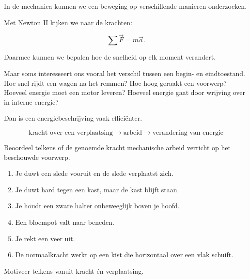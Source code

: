 \documentclass{ximera}
\begin{document}

In de mechanica kunnen we een beweging op verschillende manieren onderzoeken.

Met Newton II kijken we naar de krachten:

\[
\sum\vec F=m\vec a.
\]

Daarmee kunnen we bepalen hoe de snelheid op elk moment verandert.

Maar soms interesseert ons vooral het verschil tussen een begin- en
eindtoestand. Hoe snel rijdt een wagen na het remmen? Hoe hoog geraakt een
voorwerp? Hoeveel energie moet een motor leveren? Hoeveel energie gaat door
wrijving over in interne energie?

Dan is een energiebeschrijving vaak efficiënter.

\begin{center}
\[
\boxed{
\text{kracht over een verplaatsing}
\longrightarrow
\text{arbeid}
\longrightarrow
\text{verandering van energie}
}
\]
\end{center}

\begin{oefening}{\oefB}

Beoordeel telkens of de genoemde kracht mechanische arbeid verricht op het
beschouwde voorwerp.

\begin{enumerate}
  \item Je duwt een slede vooruit en de slede verplaatst zich.
  \item Je duwt hard tegen een kast, maar de kast blijft staan.
  \item Je houdt een zware halter onbeweeglijk boven je hoofd.
  \item Een bloempot valt naar beneden.
  \item Je rekt een veer uit.
  \item De normaalkracht werkt op een kist die horizontaal over een vlak schuift.
\end{enumerate}

Motiveer telkens vanuit kracht én verplaatsing.

\end{oefening}


\end{document}
